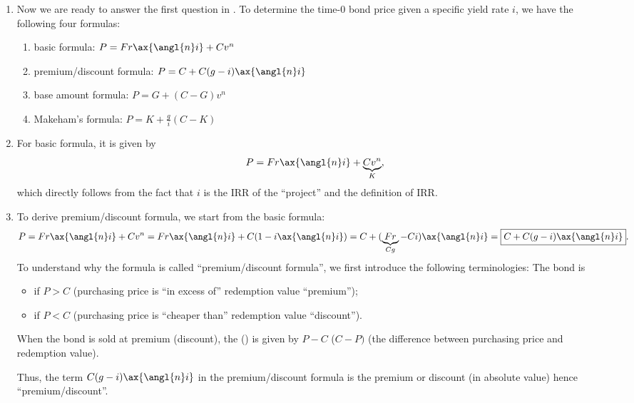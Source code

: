 \begin{enumerate}
\begin{center}
\end{center}
\item \label{it:bond-pricing-fmlas}
Now we are ready to answer the first question in
. To determine the time-0 bond price given a
specific yield rate \(i\), we have the following four formulas:
\begin{enumerate}
\item basic formula: \(P=Fr\ax{\angl{n}i}+Cv^n\)
\item premium/discount formula: \(P=C+C(g-i)\ax{\angl{n}i}\)
\item base amount formula: \(P=G+(C-G)v^n\)
\item Makeham's formula: \(\displaystyle P=K+\frac{g}{i}(C-K)\)
\end{enumerate}
\item \label{it:bond-basic-fmla}
For basic formula, it is given by
\[
P=Fr\ax{\angl{n}i}+\underbrace{Cv^n}_{K},
\]
which directly follows from the fact that \(i\) is the IRR of the ``project''
and the definition of IRR.

\item \label{it:bond-prem-disc-fmla}
To derive premium/discount formula, we start from the basic formula:
\[
P=Fr\ax{\angl{n}i}+Cv^n
=Fr\ax{\angl{n}i}+C(1-i\ax{\angl{n}i})
=C+(\underbrace{Fr}_{Cg}-Ci)\ax{\angl{n}i}
=\boxed{C+C(g-i)\ax{\angl{n}i}}.
\]
To understand why the formula is called ``premium/discount formula'', we first
introduce the following terminologies: The bond is
\begin{itemize}
\item {} if \(P>C\) (purchasing price is ``in excess of'' redemption value  ``premium'');
\item {} if \(P<C\) (purchasing price is ``cheaper than'' redemption value  ``discount'').
\end{itemize}
When the bond is sold at premium (discount), the 
() is given by \(P-C\) (\(C-P)\) (the difference between
purchasing price and redemption value).

Thus, the term \(C(g-i)\ax{\angl{n}i}\) in the premium/discount formula is the
premium or discount (in absolute value)  hence
``premium/discount''.


\end{enumerate}
